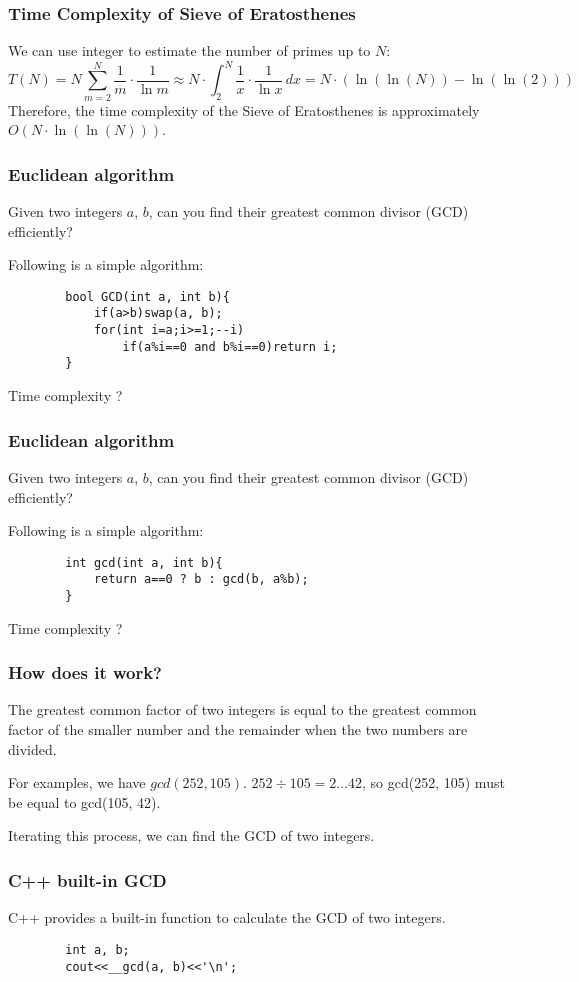 \documentclass[xcolor=dvipsnames]{beamer}
\begin{document}
    \begin{frame}
        \frametitle{Time Complexity of Sieve of Eratosthenes}
        We can use integer to estimate the number of primes up to $N$:
        $$
        T(N) = N \displaystyle\sum_{m=2}^{N} \frac{1}{m}\cdot\frac{1}{\ln m}\approx N \cdot \int_{2}^{N} \frac{1}{x} \cdot \frac{1}{\ln x} \, dx = N \cdot \left(\ln(\ln(N)) - \ln(\ln(2))\right)
        $$
        Therefore, the time complexity of the Sieve of Eratosthenes is approximately $O(N \cdot \ln(\ln(N)))$.
    \end{frame}

    \begin{frame}[fragile]
        \frametitle{Euclidean algorithm}
        Given two integers $a$, $b$, can you find their greatest common divisor (GCD) efficiently?

        Following is a simple algorithm:
        \begin{verbatim}
        bool GCD(int a, int b){
            if(a>b)swap(a, b);
            for(int i=a;i>=1;--i)
                if(a%i==0 and b%i==0)return i;
        }
        \end{verbatim}
        Time complexity ?
    \end{frame}

    \begin{frame}[fragile]
        \frametitle{Euclidean algorithm}
        Given two integers $a$, $b$, can you find their greatest common divisor (GCD) efficiently?

        Following is a simple algorithm:
        \begin{verbatim}
        int gcd(int a, int b){
            return a==0 ? b : gcd(b, a%b);
        }
        \end{verbatim}
        Time complexity ?
    \end{frame}

    \begin{frame}[fragile]
        \frametitle{How does it work?}
        The greatest common factor of two integers is equal to the greatest common factor of the smaller number and the remainder when the two numbers are divided.

        For examples, we have $gcd(252, 105)$. $252\div 105=2\ldots 42$, so gcd(252, 105) must be equal to gcd(105, 42).

        Iterating this process, we can find the GCD of two integers.
    \end{frame}
    \begin{frame}[fragile]
        \frametitle{C++ built-in GCD}
        C++ provides a built-in function to calculate the GCD of two integers. 
        \begin{verbatim}
        int a, b;
        cout<<__gcd(a, b)<<'\n';
        \end{verbatim}
    \end{frame}
\end{document}
